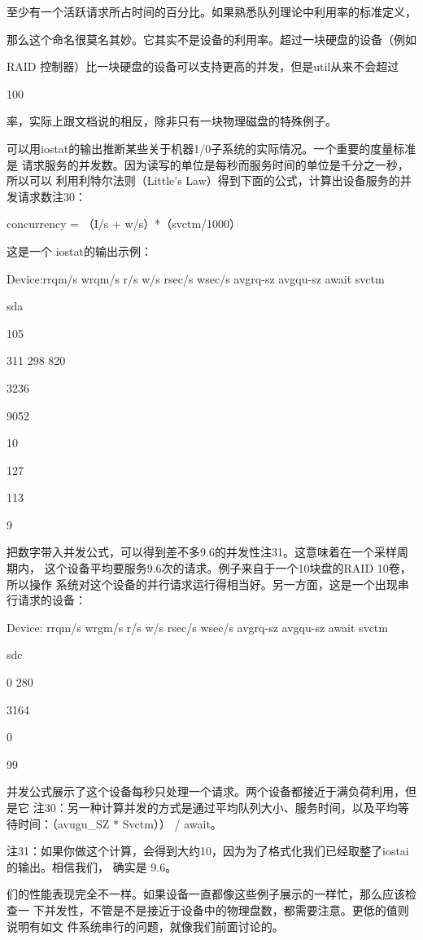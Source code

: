 
至少有一个活跃请求所占时间的百分比。如果熟悉队列理论中利用率的标准定义，

那么这个命名很莫名其妙。它其实不是设备的利用率。超过一块硬盘的设备（例如

RAID 控制器）比一块硬盘的设备可以支持更高的并发，但是util从来不会超过

100%

率，实际上跟文档说的相反，除非只有一块物理磁盘的特殊例子。

可以用iostat的输出推断某些关于机器1/0子系统的实际情况。一个重要的度量标准是
请求服务的并发数。因为读写的单位是每秒而服务时间的单位是千分之一秒，所以可以
利用利特尔法则（Little's Law）得到下面的公式，计算出设备服务的并发请求数注30：

concurrency = （I/s + w/s）*（svctm/1000）

这是一个 iostat的输出示例：

Device:rrqm/s wrqm/s r/s w/s rsec/s wsec/s avgrq-sz avgqu-sz await svctm %

sda

105

311 298 820

3236

9052

10

127

113

9

把数字带入并发公式，可以得到差不多9.6的并发性注31。这意味着在一个采样周期内，
这个设备平均要服务9.6次的请求。例子来自于一个10块盘的RAID 10卷，所以操作
系统对这个设备的并行请求运行得相当好。另一方面，这是一个出现串行请求的设备：

Device: rrqm/s wrgm/s r/s w/s rsec/s wsec/s avgrq-sz avgqu-sz await svctm %

sdc

0 280

3164

0

99

并发公式展示了这个设备每秒只处理一个请求。两个设备都接近于满负荷利用，但是它
注30：另一种计算并发的方式是通过平均队列大小、服务时间，以及平均等待时间：（avugu\_SZ * Svctm）） /
await。

注31：如果你做这个计算，会得到大约10，因为为了格式化我们已经取整了iostai的输出。相信我们，
确实是 9.6。

们的性能表现完全不一样。如果设备一直都像这些例子展示的一样忙，那么应该检查一
下并发性，不管是不是接近于设备中的物理盘数，都需要注意。更低的值则说明有如文
件系统串行的问题，就像我们前面讨论的。

